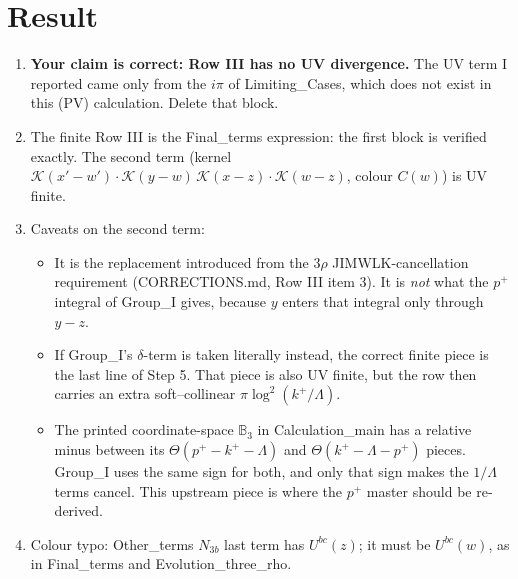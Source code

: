 \documentclass[10pt]{article}
\def\K{\mathcal{K}}
\begin{document}
\section{Result}
\begin{enumerate}
\item \textbf{Your claim is correct: Row III has no UV divergence.} The UV term I reported came only from the $i\pi$ of
Limiting\_Cases, which does not exist in this (PV) calculation. Delete that block.
\item The finite Row III is the Final\_terms expression: the first block is verified exactly.
The second term (kernel $\K(x'-w')\cdot\K(y-w)\,\K(x-z)\cdot\K(w-z)$, colour $C(w)$) is UV finite.
\item Caveats on the second term:
 \begin{itemize}
 \item It is the replacement introduced from the 3$\rho$ JIMWLK-cancellation requirement (CORRECTIONS.md, Row III item 3).
 It is \emph{not} what the $p^{+}$ integral of Group\_I gives, because $y$ enters that integral only through $y-z$.
 \item If Group\_I's $\delta$-term is taken literally instead, the correct finite piece is the last line of Step 5. That piece is also UV finite, but the row then carries an extra soft--collinear $\pi\log^2(k^+/\Lambda)$.
 \item The printed coordinate-space $\mathbb B_3$ in Calculation\_main has a relative minus between its $\Theta(p^+-k^+-\Lambda)$ and $\Theta(k^+-\Lambda-p^+)$ pieces. Group\_I uses the same sign for both, and only that sign makes the $1/\Lambda$ terms cancel. This upstream piece is where the $p^+$ master should be re-derived.
 \end{itemize}
\item Colour typo: Other\_terms $N_{3b}$ last term has $U^{bc}(z)$; it must be $U^{bc}(w)$, as in Final\_terms and Evolution\_three\_rho.
\end{enumerate}
\end{document}
